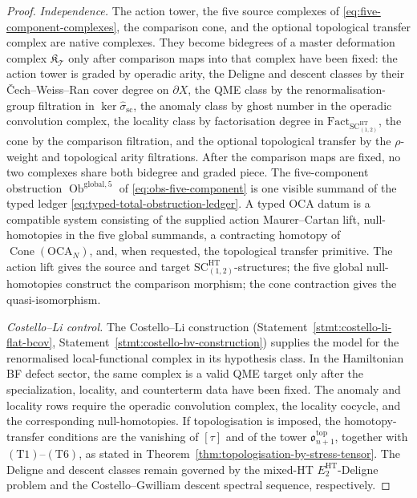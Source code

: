 \begin{proof}
\emph{Independence.}  The action tower, the five source complexes of
\eqref{eq:five-component-complexes}, the comparison cone, and the
optional topological transfer complex are native complexes.  They become
bidegrees of a master deformation complex
\(\mathfrak K_{\mathcal T}\) only after comparison maps into that
complex have been fixed: the action tower is graded by operadic arity,
the Deligne and descent classes by their Čech--Weiss--Ran cover degree
on \(\partial X\), the QME class by the renormalisation-group filtration
in \(\ker\widehat\sigma_{\mathrm{sc}}\), the anomaly class by ghost
number in the operadic convolution complex, the locality class by
factorisation degree in
\(\mathrm{Fact}_{\mathrm{SC}^{\mathrm{HT}}_{(1,2)}}\), the cone by the
comparison filtration, and the optional topological transfer by the
\(\rho\)-weight and topological arity filtrations.  After the comparison
maps are fixed, no two complexes share both bidegree and graded piece.
The five-component obstruction
\(\operatorname{Ob}^{\mathrm{global},5}\) of
\eqref{eq:obs-five-component} is one visible summand of the typed ledger
\eqref{eq:typed-total-obstruction-ledger}.  A typed OCA datum is a
compatible system consisting of the supplied action Maurer--Cartan lift,
null-homotopies in the five global summands, a contracting homotopy of
\(\operatorname{Cone}(\mathrm{OCA}_N)\), and, when requested, the
topological transfer primitive.  The action lift gives the source and
target \(\mathrm{SC}^{\mathrm{HT}}_{(1,2)}\)-structures; the five global
null-homotopies construct the comparison morphism; the cone contraction
gives the quasi-isomorphism.

  \emph{Costello--Li control.}  The Costello--Li construction
  (Statement~\ref{stmt:costello-li-flat-bcov},
  Statement~\ref{stmt:costello-bv-construction}) supplies the model for the
  renormalised local-functional complex in its hypothesis class.  In the
  Hamiltonian BF defect sector, the same complex is a valid QME target only
  after the specialization, locality, and counterterm data have been fixed.
The anomaly and locality rows require the operadic convolution complex,
the locality cocycle, and the corresponding null-homotopies.  If
topologisation is imposed, the homotopy-transfer conditions are the
vanishing of \([\tau]\) and of the tower
\(\mathfrak o^{\mathrm{top}}_{n+1}\), together with
\((\mathrm{T1})\)--\((\mathrm{T6})\), as stated in
Theorem~\ref{thm:topologisation-by-stress-tensor}.  The Deligne and
descent classes remain governed by the mixed-HT
\(E_2^{\mathrm{HT}}\)-Deligne problem and the Costello--Gwilliam descent
spectral sequence, respectively.


\end{proof}
